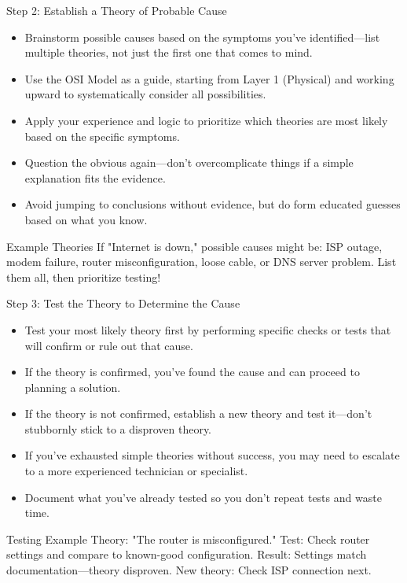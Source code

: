 \documentclass[aspectratio=169]{beamer}
\begin{document}
\begin{frame}{Step 2: Establish a Theory of Probable Cause}

\begin{itemize}
    \item Brainstorm possible causes based on the symptoms you've identified—list multiple theories, not just the first one that comes to mind.
    \item Use the OSI Model as a guide, starting from Layer 1 (Physical) and working upward to systematically consider all possibilities.
    \item Apply your experience and logic to prioritize which theories are most likely based on the specific symptoms.
    \item Question the obvious again—don't overcomplicate things if a simple explanation fits the evidence.
    \item Avoid jumping to conclusions without evidence, but do form educated guesses based on what you know.
\end{itemize}

\vspace{0.3cm}

\begin{alertblock}{Example Theories}
If "Internet is down," possible causes might be: ISP outage, modem failure, router misconfiguration, loose cable, or DNS server problem. List them all, then prioritize testing!
\end{alertblock}

\end{frame}

\begin{frame}{Step 3: Test the Theory to Determine the Cause}

\begin{itemize}
    \item Test your most likely theory first by performing specific checks or tests that will confirm or rule out that cause.
    \item If the theory is confirmed, you've found the cause and can proceed to planning a solution.
    \item If the theory is not confirmed, establish a new theory and test it—don't stubbornly stick to a disproven theory.
    \item If you've exhausted simple theories without success, you may need to escalate to a more experienced technician or specialist.
    \item Document what you've already tested so you don't repeat tests and waste time.
\end{itemize}

\vspace{0.3cm}

\begin{block}{Testing Example}
Theory: "The router is misconfigured." Test: Check router settings and compare to known-good configuration. Result: Settings match documentation—theory disproven. New theory: Check ISP connection next.
\end{block}

\end{frame}
\end{document}
